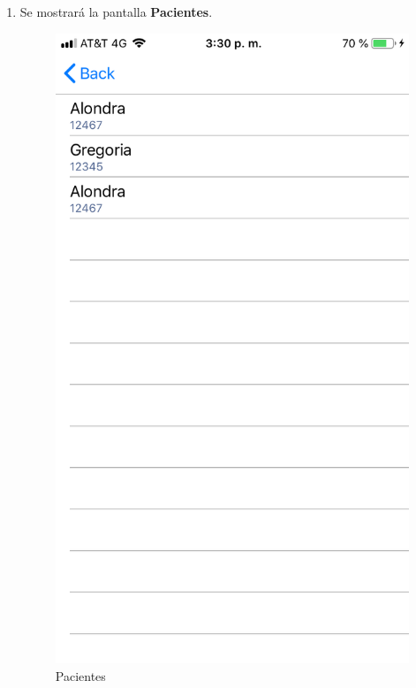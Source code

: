 \begin{enumerate}
	\item Se mostrará la pantalla \textbf{Pacientes}. 
	\newpage
	\begin{figure}[!htbp]			
		\hypertarget{fig:Pacientes}{\hspace{1pt}}
		\begin{center}
			\includegraphics[height=0.4\textheight]{Doctor/ConsultarPacientes/images/Pacientes}
			\caption{Pacientes}
			\label{fig:Pacientes}
		\end{center}
	\end{figure}

	
\end{enumerate}


